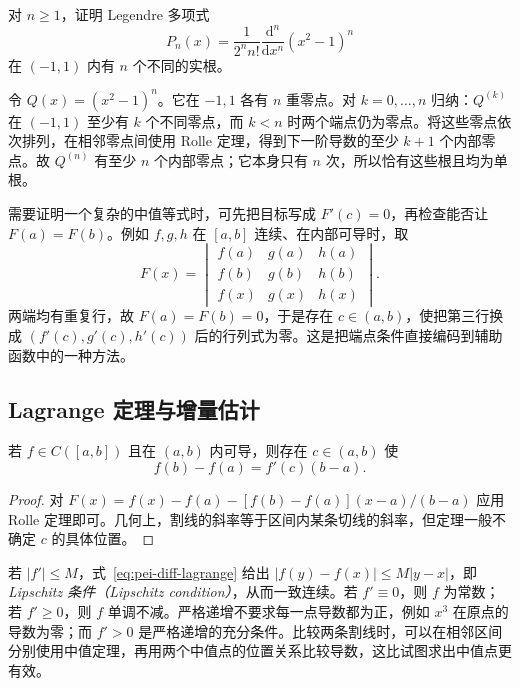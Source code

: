 \begin{example}
\label{ex:pei-diff-legendre-roots}
对 $n\ge1$，证明 Legendre 多项式
\[
 P_n(x)=\frac1{2^n n!}\frac{\mathrm d^n}{\mathrm dx^n}(x^2-1)^n
\]
在 $(-1,1)$ 内有 $n$ 个不同的实根。
\end{example}
\begin{solve}
令 $Q(x)=(x^2-1)^n$。它在 $-1,1$ 各有 $n$ 重零点。对 $k=0,\ldots,n$ 归纳：$Q^{(k)}$ 在 $(-1,1)$ 至少有 $k$ 个不同零点，而 $k<n$ 时两个端点仍为零点。将这些零点依次排列，在相邻零点间使用 Rolle 定理，得到下一阶导数的至少 $k+1$ 个内部零点。故 $Q^{(n)}$ 有至少 $n$ 个内部零点；它本身只有 $n$ 次，所以恰有这些根且均为单根。
\end{solve}

需要证明一个复杂的中值等式时，可先把目标写成 $F'(c)=0$，再检查能否让 $F(a)=F(b)$。例如 $f,g,h$ 在 $[a,b]$ 连续、在内部可导时，取
\[
 F(x)=\begin{vmatrix}
 f(a)&g(a)&h(a)\\f(b)&g(b)&h(b)\\f(x)&g(x)&h(x)
 \end{vmatrix}.
\]
两端均有重复行，故 $F(a)=F(b)=0$，于是存在 $c\in(a,b)$，使把第三行换成 $(f'(c),g'(c),h'(c))$ 后的行列式为零。这是把端点条件直接编码到辅助函数中的一种方法。

\subsection{Lagrange 定理与增量估计}

\begin{theorem}
\label{thm:pei-diff-lagrange}
若 $f\in C([a,b])$ 且在 $(a,b)$ 内可导，则存在 $c\in(a,b)$ 使
\begin{equation}
 f(b)-f(a)=f'(c)(b-a).
 \label{eq:pei-diff-lagrange}
\end{equation}
\end{theorem}
\begin{proof}
对 $F(x)=f(x)-f(a)-[f(b)-f(a)](x-a)/(b-a)$ 应用 Rolle 定理即可。几何上，割线的斜率等于区间内某条切线的斜率，但定理一般不确定 $c$ 的具体位置。
\end{proof}

若 $|f'|\le M$，式~\eqref{eq:pei-diff-lagrange} 给出 $|f(y)-f(x)|\le M|y-x|$，即 \emph{Lipschitz 条件（Lipschitz condition）}，从而一致连续。若 $f'\equiv0$，则 $f$ 为常数；若 $f'\ge0$，则 $f$ 单调不减。严格递增不要求每一点导数都为正，例如 $x^3$ 在原点的导数为零；而 $f'>0$ 是严格递增的充分条件。比较两条割线时，可以在相邻区间分别使用中值定理，再用两个中值点的位置关系比较导数，这比试图求出中值点更有效。

